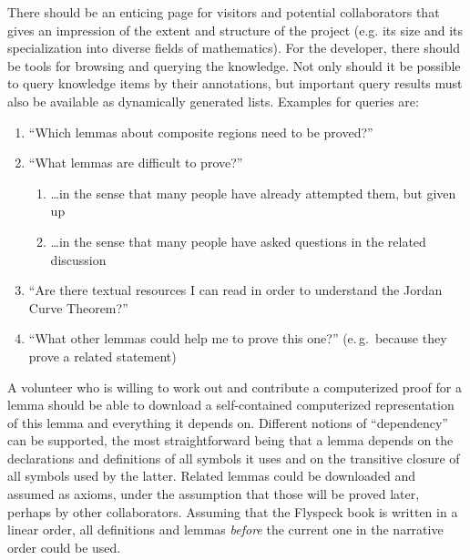 There should be an enticing page for visitors and potential
collaborators that gives an impression of the extent and structure of
the project (e.g. its size and its specialization into diverse fields
of mathematics).  For the developer, there should be tools for
browsing and querying the knowledge.  Not only should it be possible
to query knowledge items by their annotations, but important query
results must also be available as dynamically generated lists.
Examples for queries are:

\begin{enumerate}
\item\label{item:proven-lemma} ``Which lemmas about composite regions need
  to be proved?''
\item ``What lemmas are difficult to prove?''
  \begin{enumerate}
  \item \ldots in the sense that many people have already attempted them, but given up
  \item\label{item:question-count} \ldots in the sense that many people have asked
    questions in the related discussion
  \end{enumerate}
\item ``Are there textual resources I can read in order to understand the Jordan
  Curve Theorem?''
\item ``What other lemmas could help me to prove this one?'' (e.\,g.\ because
  they prove a related statement)
\end{enumerate}

A volunteer who is willing to work out and contribute a computerized proof for
a lemma should be able to download a self-contained computerized
representation of this lemma and everything it depends on.  Different
notions of ``dependency'' can be supported,
the most straightforward being that a lemma depends on the
declarations and definitions of all symbols it uses and on the transitive
closure of all symbols used by the latter.  Related lemmas
could be downloaded and assumed as axioms, under the assumption that
those will be proved later, perhaps by other collaborators.  
Assuming that the Flyspeck book is written in a
linear order, all definitions and lemmas \emph{before} the current one in the
narrative order could be used.

